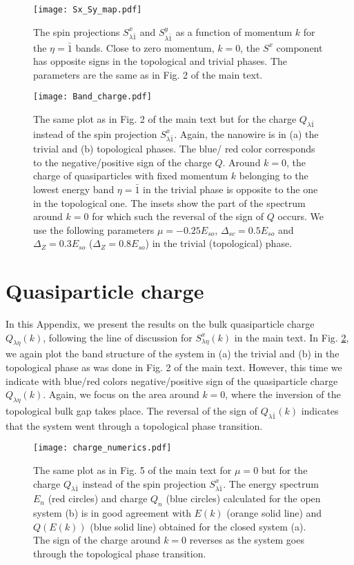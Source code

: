 \documentclass[prl,twocolumn,showpacs,floatfix,amsbsy,amsbsy,superscriptaddress]{revtex4-1}
\begin{document}
\begin{figure}[ht]
\centering
\texttt{[image: Sx\_Sy\_map.pdf]}
\caption{The spin projections ${ S}^x_{\lambda \bar1}$ and ${ S}^y_{\lambda \bar1}$  as a function of momentum $k$ for the $\eta=\bar 1$ bands. Close to zero momentum, $k=0$, the $S^x$ component has opposite signs in the topological and trivial phases. 
The parameters are the same as in Fig. 2 of the main text. 
}
  \label{fig:Fig6}
\end{figure}

\begin{figure}[b]
\centering
\texttt{[image: Band\_charge.pdf]}
\caption{The same plot as in Fig. 2 of the main text but for the charge $Q_{\lambda \bar 1}$ instead of the spin projection $S^x_{\lambda \bar 1}$. Again,  the nanowire is in (a) the trivial and (b) topological phases. The blue/ red color corresponds to the negative/positive sign of the charge $Q$. Around $k=0$,  the charge of quasiparticles with fixed momentum $k$ belonging to the lowest energy band $\eta=\bar 1$ in the trivial phase is opposite to the one in the topological one. The insets show the part of the spectrum around $k=0$ for which such the reversal of the sign of $Q$ occurs. We use the following parameters $\mu=- 0.25E_{so}$, $\Delta_{sc}=0.5E_{so}$ and $\Delta_{Z}= 0.3E_{so}$ ($\Delta_{Z}=0.8E_{so}$) in the trivial (topological) phase.
  }
  \label{fig:Fig8}
\end{figure}

\section{Quasiparticle charge }\label{charge_results}

In this Appendix, we present the results on the bulk quasiparticle charge $Q_{\lambda \eta} (k)$, following the line of discussion for  $S^x_{\lambda \eta} (k)$ in the main text. In Fig. \ref{fig:Fig8}, we again plot  the band structure of the system in (a) the trivial and (b) in the topological  phase as was done in Fig. 2 of the main text. However, this time we indicate with blue/red colors negative/positive sign of the quasiparticle charge $Q_{\lambda \eta} (k)$. Again, we focus on the area around $k=0$, where the inversion of the topological bulk gap takes place.  The reversal of the sign of $Q_{\lambda \bar 1} (k)$ indicates that the system went through a topological phase transition. 

\begin{figure}[ht]
\centering
\texttt{[image: charge\_numerics.pdf]}
\caption{ The same plot as in Fig. 5 of the main text for $\mu=0$ but for the charge $Q_{\lambda \bar 1}$ instead of the spin projection $S^x_{\lambda \bar 1}$.
The energy spectrum $E_n$ (red circles) and charge $Q_n$ (blue circles) calculated  for the open system (b) is in good agreement with  $E(k)$ (orange solid line) and $Q(E(k))$ (blue solid line) obtained for the closed system (a).
The sign of the charge around $k=0$ reverses as the system goes through the topological phase transition.}
  \label{fig:Fig10}
\end{figure}
\end{document}
